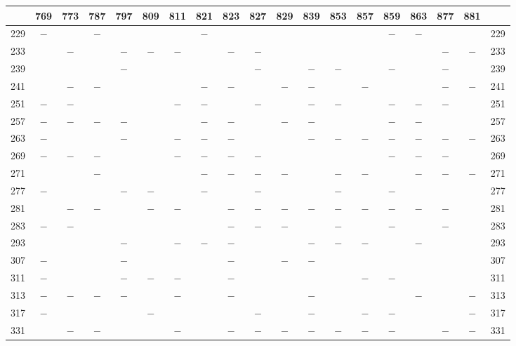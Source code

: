 \clearpage
{}%
\begin{center}\begingroup\fontsize{8}{10.5}\selectfont\setlength{\tabcolsep}{2pt}
\begin{tabular}{r|c|c|c|c|c|c|c|c|c|c|c|c|c|c|c|c|c|r}
\hline
 & 769 & 773 & 787 & 797 & 809 & 811 & 821 & 823 & 827 & 829 & 839 & 853 & 857 & 859 & 863 & 877 & 881 & \\
\hline
229 & $-$ &  & $-$ &  &  &  & $-$ &  &  &  &  &  &  & $-$ & $-$ &  &  & 229\\
233 &  & $-$ &  & $-$ & $-$ & $-$ &  & $-$ & $-$ &  &  &  &  &  &  & $-$ & $-$ & 233\\
239 &  &  &  & $-$ &  &  &  &  & $-$ &  & $-$ & $-$ &  & $-$ &  & $-$ &  & 239\\
241 &  & $-$ & $-$ &  &  &  & $-$ & $-$ &  & $-$ & $-$ &  & $-$ &  &  & $-$ & $-$ & 241\\
251 & $-$ & $-$ &  &  &  & $-$ & $-$ &  & $-$ &  & $-$ & $-$ &  & $-$ & $-$ & $-$ &  & 251\\
257 & $-$ & $-$ & $-$ & $-$ &  &  & $-$ & $-$ &  & $-$ & $-$ &  &  & $-$ & $-$ &  &  & 257\\
263 & $-$ &  &  & $-$ &  & $-$ & $-$ & $-$ &  &  & $-$ & $-$ & $-$ & $-$ & $-$ & $-$ & $-$ & 263\\
269 & $-$ & $-$ & $-$ &  &  & $-$ & $-$ & $-$ & $-$ &  &  &  &  & $-$ & $-$ & $-$ &  & 269\\
271 &  &  & $-$ &  &  &  & $-$ & $-$ & $-$ & $-$ &  & $-$ & $-$ &  & $-$ & $-$ & $-$ & 271\\
277 & $-$ &  &  & $-$ & $-$ &  & $-$ &  & $-$ &  &  & $-$ &  & $-$ &  &  &  & 277\\
281 &  & $-$ & $-$ &  & $-$ & $-$ &  & $-$ & $-$ & $-$ & $-$ & $-$ & $-$ & $-$ & $-$ & $-$ &  & 281\\
283 & $-$ & $-$ &  &  &  &  &  & $-$ & $-$ & $-$ &  & $-$ &  & $-$ &  & $-$ &  & 283\\
293 &  &  &  & $-$ &  & $-$ & $-$ & $-$ &  &  & $-$ & $-$ & $-$ &  & $-$ &  &  & 293\\
307 & $-$ &  &  & $-$ &  &  &  & $-$ &  & $-$ & $-$ &  &  &  &  &  &  & 307\\
311 & $-$ &  &  & $-$ & $-$ & $-$ &  & $-$ &  &  &  &  & $-$ & $-$ &  &  &  & 311\\
313 & $-$ & $-$ & $-$ & $-$ &  & $-$ &  & $-$ &  &  & $-$ &  &  &  & $-$ &  & $-$ & 313\\
317 & $-$ &  &  &  & $-$ &  &  &  & $-$ &  & $-$ &  & $-$ & $-$ &  &  & $-$ & 317\\
331 &  & $-$ & $-$ &  &  & $-$ &  & $-$ & $-$ & $-$ & $-$ & $-$ & $-$ & $-$ &  & $-$ & $-$ & 331\\

\end{tabular}
\end{center}
